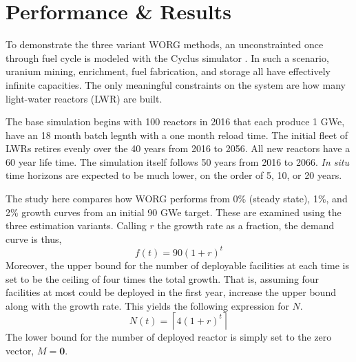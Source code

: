 \section{Performance \& Results}
\label{results}

To demonstrate the three variant WORG methods, an unconstrainted once 
through fuel cycle is modeled with the Cyclus simulator 
\cite{DBLP:journals/corr/HuffGCFMOSSW15}. In such a scenario, uranium
mining, enrichment, fuel fabrication, and storage all have effectively 
infinite capacities. The only meaningful constraints on the system are
how many light-water reactors (LWR) are built.

The base simulation begins with 100 reactors in 2016 that each produce
1 GWe, have an 18 month batch legnth with a one month reload time.
The initial fleet of LWRs retires evenly over the 40 years from 2016 to 
2056. All new reactors have a 60 year life time.  The simulation itself 
follows 50 years from 2016 to 2066. \emph{In situ} time horizons are 
expected to be much lower, on the order of 5, 10, or 20 years.

The study here compares how WORG performs from 0\% (steady state), 1\%, 
and 2\% growth curves from an initial 90 GWe target. These are examined
using the three estimation variants.  Calling $r$ the growth rate as a 
fraction, the demand curve is thus,
\begin{equation}
\label{f-rate}
f(t) = 90 (1 + r)^t
\end{equation}
Moreover, the upper bound for the number of deployable facilities at 
each time is set to be the ceiling of four times the total growth. 
That is, assuming four facilities at most could be deployed in the first
year, increase the upper bound along with the growth rate.  This yields
the following expression for $N$.
\begin{equation}
\label{n-rate}
N(t) = \left\lceil 4 (1 + r)^t\right\rceil
\end{equation}
The lower bound for the number of deployed reactor is simply set to the 
zero vector, $M = \mathbf{0}$.